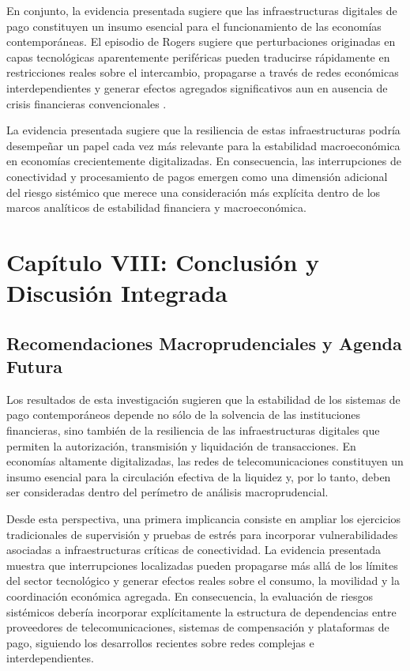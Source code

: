 En conjunto, la evidencia presentada sugiere que las infraestructuras digitales de pago constituyen un insumo esencial para el funcionamiento de las econom\'ias contempor\'aneas. El episodio de Rogers sugiere que perturbaciones originadas en capas tecnol\'ogicas aparentemente perif\'ericas pueden traducirse r\'apidamente en restricciones reales sobre el intercambio, propagarse a trav\'es de redes econ\'omicas interdependientes y generar efectos agregados significativos aun en ausencia de crisis financieras convencionales \citep{barabasi2016network, newman2010networks}.

La evidencia presentada sugiere que la resiliencia de estas infraestructuras podr\'ia desempe\~nar un papel cada vez m\'as relevante para la estabilidad macroecon\'omica en econom\'ias crecientemente digitalizadas. En consecuencia, las interrupciones de conectividad y procesamiento de pagos emergen como una dimensi\'on adicional del riesgo sist\'emico que merece una consideraci\'on m\'as expl\'icita dentro de los marcos anal\'iticos de estabilidad financiera y macroecon\'omica.

\newpage
\section{Cap\'itulo VIII: Conclusi\'on y Discusi\'on Integrada}
\label{chp:capitulo8}

\subsection{Recomendaciones Macroprudenciales y Agenda Futura}
\label{sec:8_1}

Los resultados de esta investigaci\'on sugieren que la estabilidad de los sistemas de pago contempor\'aneos depende no s\'olo de la solvencia de las instituciones financieras, sino tambi\'en de la resiliencia de las infraestructuras digitales que permiten la autorizaci\'on, transmisi\'on y liquidaci\'on de transacciones. En econom\'ias altamente digitalizadas, las redes de telecomunicaciones constituyen un insumo esencial para la circulaci\'on efectiva de la liquidez y, por lo tanto, deben ser consideradas dentro del per\'imetro de an\'alisis macroprudencial.

Desde esta perspectiva, una primera implicancia consiste en ampliar los ejercicios tradicionales de supervisi\'on y pruebas de estr\'es para incorporar vulnerabilidades asociadas a infraestructuras cr\'iticas de conectividad. La evidencia presentada muestra que interrupciones localizadas pueden propagarse m\'as all\'a de los l\'imites del sector tecnol\'ogico y generar efectos reales sobre el consumo, la movilidad y la coordinaci\'on econ\'omica agregada. En consecuencia, la evaluaci\'on de riesgos sist\'emicos deber\'ia incorporar expl\'icitamente la estructura de dependencias entre proveedores de telecomunicaciones, sistemas de compensaci\'on y plataformas de pago, siguiendo los desarrollos recientes sobre redes complejas e interdependientes.

